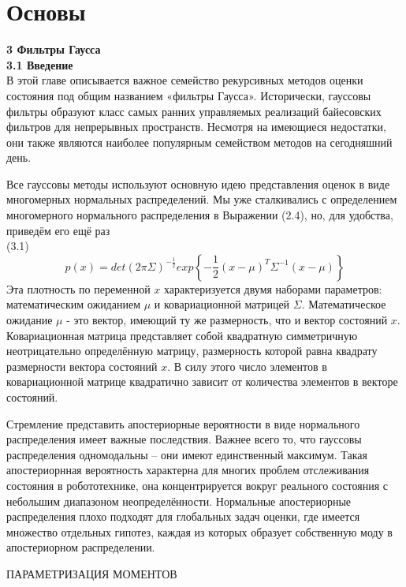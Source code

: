 \documentclass[10pt,a4paper]{article}
\begin{document}
\part{Основы}

 \textbf{\Large3 Фильтры Гаусса}\\
 
 \textbf{3.1 Введение}\\
 
 В этой главе описывается важное семейство рекурсивных методов оценки состояния под общим названием «фильтры Гаусса». Исторически, гауссовы фильтры образуют класс самых ранних управляемых реализаций байесовских фильтров для непрерывных пространств. Несмотря на имеющиеся недостатки, они также являются наиболее популярным семейством методов на сегодняшний день.
 
 Все гауссовы методы используют основную идею представления оценок в виде многомерных нормальных распределений. Мы уже сталкивались с определением многомерного нормального распределения в Выражении (2.4), но, для удобства, приведём его ещё раз\\
 
 (3.1)$$p(x)=det(2\pi\varSigma)^{-\frac{1}{2}}exp\left\lbrace-\frac{1}{2}(x-\mu)^T\varSigma^{-1}(x-\mu)\right\rbrace $$
 Эта плотность по переменной $x$ характеризуется двумя наборами параметров: математическим ожиданием $\mu$ и ковариационной матрицей $\varSigma$. Математическое ожидание $\mu$ - это вектор, имеющий ту же размерность, что и вектор состояний $x$. Ковариационная матрица представляет собой квадратную симметричную неотрицательно определённую матрицу, размерность которой равна квадрату размерности вектора состояний $x$. В силу этого число элементов в ковариационной матрице квадратично зависит от количества элементов в векторе состояний.
 
 Стремление представить апостериорные вероятности в виде нормального распределения имеет важные последствия. Важнее всего то, что гауссовы распределения одномодальны – они имеют единственный максимум. Такая апостериорнная вероятность характерна для многих проблем отслеживания состояния в робототехнике, она концентрируется вокруг реального состояния с небольшим диапазоном неопределённости. Нормальные апостериорные распределения плохо подходят для глобальных задач оценки, где имеется множество отдельных гипотез, каждая из которых образует собственную моду в апостериорном распределении.
 
 ПАРАМЕТРИЗАЦИЯ МОМЕНТОВ
 
\end{document}
